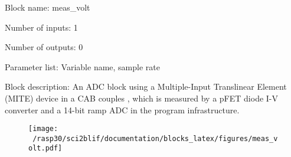 \pagebreak

Block name: meas\_volt

Number of inputs: 1

Number of outputs: 0

Parameter list: Variable name, sample rate

Block description: 
An ADC block using a Multiple-Input Translinear Element (MITE) device in a CAB couples , which is measured by a pFET diode I-V converter and a 14-bit ramp ADC in the program infrastructure.

\begin{figure}[H]  %
\texttt{[image: ~/rasp30/sci2blif/documentation/blocks\_latex/figures/meas\_volt.pdf]}
\end{figure}

